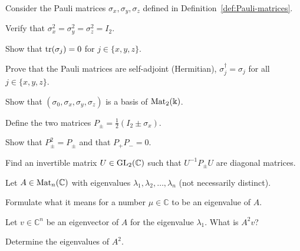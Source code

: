 \documentclass[a4paper, oneside, 12pt]{amsart}
\begin{document}
\begin{exercise}\label{ex:props-of-Pauli-matrices}
  Consider the Pauli matrices \(\sigma_x, \sigma_y, \sigma_z\) defined in Definition~\ref{def:Pauli-matrices}.
  \begin{thmlist}
    \item Verify that \(\sigma_x^2 = \sigma_y^2 = \sigma_z^2 = I_2\).
    \item Show that \(\operatorname{tr}(\sigma_j) = 0\) for \(j \in \{x, y, z\}\).
    \item Prove that the Pauli matrices are self-adjoint (Hermitian), \ie \(\sigma_j^\dagger = \sigma_j\) for all \(j \in\{x,y,z\}\).
    \item Show that \((\sigma_{0}, \sigma_{x}, \sigma_{y}, \sigma_{z})\) is a basis of \(\operatorname{Mat}_{2}( \Bbbk)\).
  \end{thmlist}
  Define the two matrices \(P_{\pm} = \frac{1}{2}(I_2 \pm \sigma_x)\).
  \begin{thmlist}[resume]
    \item Show that \(P_{\pm}^{2} = P_{\pm}\) and that \(P_+ P_- = 0\).
    \item Find an invertible matrix \(U\in \operatorname{GL}_{2}( \mathbb{C})\) such that \(U^{-1}P_{\pm}U\) are diagonal matrices.
  \end{thmlist}
\end{exercise}

\begin{exercise}
  Let \(A \in \operatorname{Mat}_n(\mathbb{C})\) with eigenvalues \(\lambda_{1}, \lambda_{2}, \dots , \lambda_{n}\) (not necessarily distinct).
  \begin{thmlist}
    \item Formulate what it means for a number \(\mu \in \mathbb{C}\) to be an eigenvalue of \(A\).
    \item Let \(v \in \mathbb{C}^{n}\) be an eigenvector of \(A\) for the eigenvalue \(\lambda_{1}\).
    What is \(A^{2}v\)?
    \item Determine the eigenvalues of \(A^{2}\).
  \end{thmlist}
\end{exercise}
\end{document}
